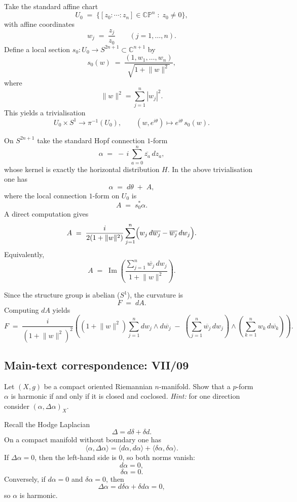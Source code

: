 \begin{solution}
Take the standard affine chart
\[
U_0 \;=\;\{[z_0:\cdots:z_n]\in \mathbb{CP}^n \;:\; z_0\neq 0\},
\]
with affine coordinates
\[
w_j \;=\;\frac{z_j}{z_0}\qquad (j=1,\dots,n).
\]
Define a local section $s_0:U_0\to S^{2n+1}\subset \mathbb{C}^{n+1}$ by
\[
s_0(w)\;=\;\frac{(1,w_1,\dots,w_n)}{\sqrt{1+\lVert w\rVert^2}},
\]
where
\[
\lVert w\rVert^2=\sum_{j=1}^n |w_j|^2.
\]
This yields a trivialisation
\[
U_0\times S^1 \longrightarrow \pi^{-1}(U_0),
\qquad
(w,e^{i\theta})\longmapsto e^{i\theta}\,s_0(w).
\]

On $S^{2n+1}$ take the standard Hopf connection $1$-form
\[
\alpha \;=\; -\,i\,\sum_{a=0}^n \overline{z_a}\,dz_a,
\]
whose kernel is exactly the horizontal distribution $H$.
In the above trivialisation one has
\[
\alpha \;=\; d\theta \;+\; A,
\]
where the local connection $1$-form on $U_0$ is
\[
A \;=\; s_0^{*}\alpha.
\]
A direct computation gives
\[
A \;=\; \frac{i}{2(1+\lVert w\rVert^2)}\sum_{j=1}^n\Bigl(w_j\,d\overline{w_j}-\overline{w_j}\,dw_j\Bigr).
\]
Equivalently,
\[
A \;=\; \operatorname{Im}\!\left(\frac{\sum_{j=1}^n \overline{w_j}\,dw_j}{1+\lVert w\rVert^2}\right).
\]

Since the structure group is abelian ($S^1$), the curvature is
\[
F \;=\; dA.
\]
Computing $dA$ yields
\[
F
\;=\;
\frac{i}{(1+\lVert w\rVert^2)^2}
\left(
(1+\lVert w\rVert^2)\sum_{j=1}^n dw_j\wedge d\overline{w_j}
\;-\;
\left(\sum_{j=1}^n \overline{w_j}\,dw_j\right)\wedge
\left(\sum_{k=1}^n w_k\,d\overline{w_k}\right)
\right).
\]

\end{solution}

\subsection*{Main-text correspondence: VII/09}

\begin{problem}
\label{prob:cp-vii-0032}
Let $(X,g)$ be a compact oriented Riemannian $n$-manifold.
Show that a $p$-form $\alpha$ is harmonic if and only if it is closed and coclosed.
\textit{Hint:} for one direction consider $(\alpha,\Delta\alpha)_X$.
\end{problem}

\begin{solution}
Recall the Hodge Laplacian
\[
\Delta=d\delta+\delta d.
\]
On a compact manifold without boundary one has
\[
\langle \alpha,\Delta\alpha\rangle
=
\langle d\alpha,d\alpha\rangle
+
\langle \delta\alpha,\delta\alpha\rangle.
\]
If $\Delta\alpha=0$, then the left-hand side is $0$, so both norms vanish:
\[
d\alpha=0,
\]
\[
\delta\alpha=0.
\]
Conversely, if $d\alpha=0$ and $\delta\alpha=0$, then
\[
\Delta\alpha=d\delta\alpha+\delta d\alpha=0,
\]
so $\alpha$ is harmonic.
\end{solution}

